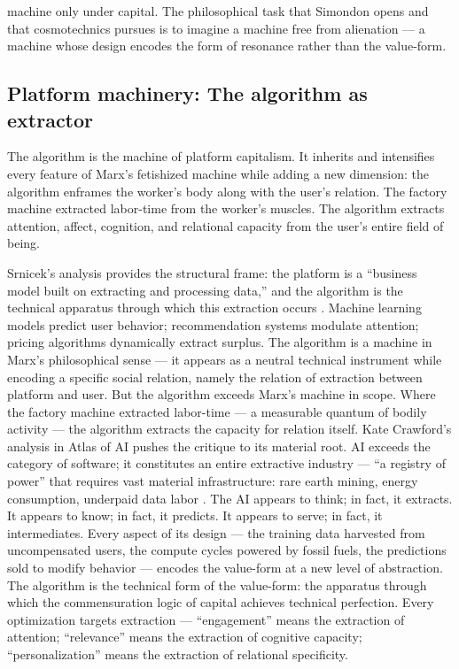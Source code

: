 machine only under capital. The philosophical task that Simondon opens and that cosmotechnics pursues is to imagine a machine free from alienation — a machine whose design encodes the form of resonance rather than the value-form.

\subsection{Platform machinery: The algorithm as extractor}

The algorithm is the machine of platform capitalism. It inherits and intensifies every feature of Marx’s fetishized machine while adding a new dimension: the algorithm enframes the worker’s body along with the user’s relation. The factory machine extracted labor-time from the worker’s muscles. The algorithm extracts attention, affect, cognition, and relational capacity from the user’s entire field of being.

Srnicek’s analysis provides the structural frame: the platform is a “business model built on extracting and processing data,” and the algorithm is the technical apparatus through which this extraction occurs \cite[p.~42]{srnicek_2017}. Machine learning models predict user behavior; recommendation systems modulate attention; pricing algorithms dynamically extract surplus. The algorithm is a machine in Marx’s philosophical sense — it appears as a neutral technical instrument while encoding a specific social relation, namely the relation of extraction between platform and user. But the algorithm exceeds Marx’s machine in scope. Where the factory machine extracted labor-time — a measurable quantum of bodily activity — the algorithm extracts the capacity for relation itself. Kate Crawford’s analysis in Atlas of AI pushes the critique to its material root. AI exceeds the category of software; it constitutes an entire extractive industry — “a registry of power” that requires vast material infrastructure: rare earth mining, energy consumption, underpaid data labor \cite{crawford_2021}. The AI appears to think; in fact, it extracts. It appears to know; in fact, it predicts. It appears to serve; in fact, it intermediates. Every aspect of its design — the training data harvested from uncompensated users, the compute cycles powered by fossil fuels, the predictions sold to modify behavior — encodes the value-form at a new level of abstraction. The algorithm is the technical form of the value-form: the apparatus through which the commensuration logic of capital achieves technical perfection. Every optimization targets extraction — “engagement” means the extraction of attention; “relevance” means the extraction of cognitive capacity; “personalization” means the extraction of relational specificity.

